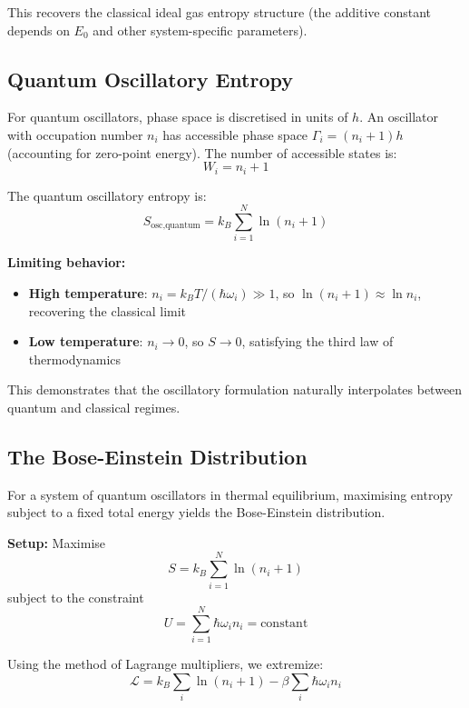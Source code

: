 This recovers the classical ideal gas entropy structure (the additive constant depends on $E_0$ and other system-specific parameters).

\subsection{Quantum Oscillatory Entropy}

For quantum oscillators, phase space is discretised in units of $h$. An oscillator with occupation number $n_i$ has accessible phase space $\Gamma_i = (n_i + 1)h$ (accounting for zero-point energy). The number of accessible states is:
\begin{equation}
W_i = n_i + 1
\end{equation}

The quantum oscillatory entropy is:
\begin{equation}
S_{\text{osc,quantum}} = k_B \sum_{i=1}^{N} \ln(n_i + 1)
\end{equation}

\textbf{Limiting behavior:}
\begin{itemize}
\item \textbf{High temperature}: $n_i = k_B T/(\hbar\omega_i) \gg 1$, so $\ln(n_i + 1) \approx \ln n_i$, recovering the classical limit
\item \textbf{Low temperature}: $n_i \to 0$, so $S \to 0$, satisfying the third law of thermodynamics
\end{itemize}

This demonstrates that the oscillatory formulation naturally interpolates between quantum and classical regimes.

\subsection{The Bose-Einstein Distribution}

For a system of quantum oscillators in thermal equilibrium, maximising entropy subject to a fixed total energy yields the Bose-Einstein distribution.

\textbf{Setup:} Maximise 
\begin{equation}
S = k_B \sum_{i=1}^{N} \ln(n_i + 1)
\end{equation}
subject to the constraint
\begin{equation}
U = \sum_{i=1}^{N} \hbar\omega_i n_i = \text{constant}
\end{equation}

Using the method of Lagrange multipliers, we extremize:
\begin{equation}
\mathcal{L} = k_B \sum_i \ln(n_i + 1) - \beta \sum_i \hbar\omega_i n_i
\end{equation}

